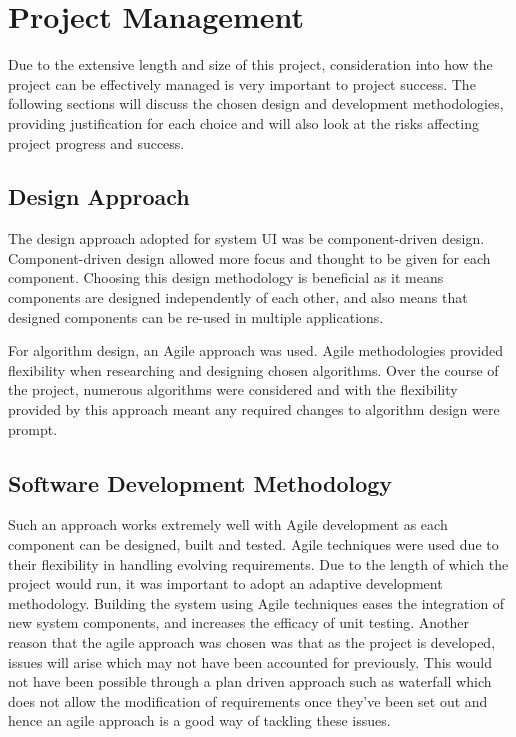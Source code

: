 \chapter{Project Management}
\label{Chapter:ProjectManagement}
Due to the extensive length and size of this project, consideration into how the project can be effectively
managed is very important to project success. The following sections will discuss the chosen design and development methodologies, providing justification for each choice and will also look at the risks affecting project progress and success.

\section{Design Approach}
The design approach adopted for system UI was be component-driven design. Component-driven design allowed more focus and thought to be given for each component. Choosing this design methodology is beneficial as it means components are designed independently of each other, and also means that designed components can be re-used in multiple applications. 

For algorithm design, an Agile approach was used. Agile methodologies provided flexibility when researching and designing chosen algorithms. Over the course of the project, numerous algorithms were considered and with the flexibility provided by this approach meant any required changes to algorithm design were prompt.

\section{Software Development Methodology}
Such an approach works extremely well with Agile development as each component can be designed, built and tested. Agile techniques were used due to their flexibility in handling evolving requirements. Due to the length of which the project would run, it was important to adopt an adaptive development methodology. Building the system using Agile techniques eases the integration of new system components, and increases the efficacy of unit testing. Another reason that the agile approach was chosen was that as the project is developed, issues will arise which may not have been accounted for previously. This would not have been possible through a plan driven approach such as waterfall which does not allow the modification of requirements once they've been set out and hence an agile approach is a good way of tackling these issues. 

